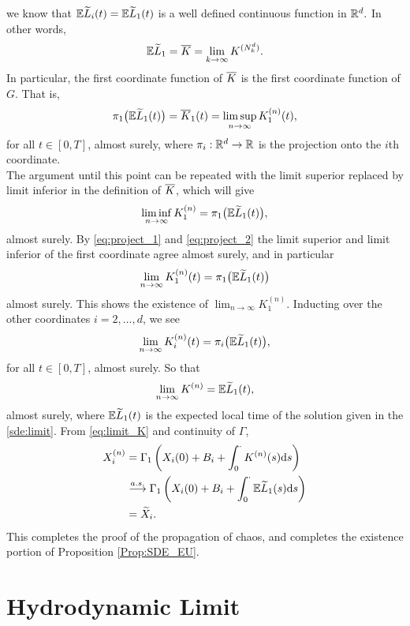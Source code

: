 we know that $\mathbb{E} \widetilde{L}_i(t) = \mathbb{E} \widetilde{L}_1(t)$ is a well defined continuous function in $\mathbb{R}^d.$ In other words,
\[
\mathbb{E} \widetilde{L}_1 = \overline{K} = \lim_{k \to \infty} K^{(N_k^d)}.
\]
In particular, the first coordinate function of $\overline{K}$ is the first coordinate function of $G.$ That is,
\begin{align}\label{eq:project_1}
\pi_1\big(\mathbb{E} \widetilde{L}_1(t)\big) = \overline{K}_1(t) = \limsup_{n \to \infty}K_1^{(n)}(t),
\end{align}
for all $t \in [0, T]$, almost surely,
where $\pi_i: \mathbb{R}^d \to \mathbb{R}$ is the projection onto the $i$th coordinate. \\
\indent The argument until this point can be repeated with the limit superior replaced by limit inferior in the definition of $\overline{K}$, which will give
\begin{align}\label{eq:project_2}
\liminf_{n \to \infty} K_1^{(n)} = \pi_1\big(\mathbb{E} \widetilde{L}_1(t)\big),
\end{align}
almost surely. By \eqref{eq:project_1} and \eqref{eq:project_2} the limit superior and limit inferior of the first coordinate agree almost surely, and in particular
\[
\lim_{n \to \infty}K_1^{(n)}(t) = \pi_1\big(\mathbb{E} \widetilde{L}_1(t)\big)
\]
almost surely. This shows the existence of $\lim_{n \to \infty}K_1^{(n)}.$ Inducting over the other coordinates $i = 2, \dots, d$, we see 
\[
\lim_{n \to \infty}K_i^{(n)}(t) = \pi_i\big(\mathbb{E} \widetilde{L}_1(t)\big),
\]
for all $t \in [0, T]$, almost surely. So that
\begin{align}\label{eq:limit_K}
\lim_{n \to \infty}K^{(n)} = \mathbb{E} \widetilde{L}_1(t),
\end{align}
almost surely, where $\mathbb{E} \widetilde{L}_1(t)$ is the expected local time of the solution given in the \eqref{sde:limit}.
From \eqref{eq:limit_K} and continuity of $\Gamma$,
\begin{align*}
	X_i^{(n)} &= \Gamma_1\left(X_i(0) + B_i  + \int_0^\cdot K^{(n)}(s) \mathrm{d} s\right)\\
	&\overset{a.s.}{\longrightarrow} \Gamma_1\left( X_i(0) + B_i + \int_0^\cdot \mathbb{E} \widetilde{L}_1(s) \mathrm{d} s\right)\\
	&= \widetilde{X}_i.
\end{align*}
This completes the proof of the propagation of chaos, and completes the existence portion of Proposition \ref{Prop:SDE_EU}.

\section{Hydrodynamic Limit}


